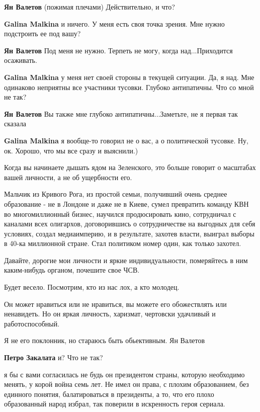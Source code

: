\begin{itemize}
\begin{itemize}
\textbf{Ян Валетов} (пожимая плечами) Действительно, и что?

\textbf{Galina Malkina} и ничего.
У меня есть своя точка зрения. Мне нужно подстроить ее под вашу?

\textbf{Ян Валетов} Под меня не нужно. Терпеть не могу, когда над...Приходится осаживать.

\textbf{Galina Malkina} у меня нет своей стороны в текущей ситуации.
Да, я над. Мне одинаково неприятны все участники тусовки. Глубоко антипатичны.
Что со мной не так?

\textbf{Ян Валетов} Вы также мне глубоко антипатичны...Заметьте, не я первая так сказала

\textbf{Galina Malkina} я вообще-то говорил не о вас, а о политической тусовке. Ну, ок. Хорошо, что мы все сразу и выяснили.)
\end{itemize} %


Когда вы начинаете дышать ядом на Зеленского, это больше говорит о масштабах
вашей личности, а не об ущербности его.

Мальчик из Кривого Рога, из простой семьи, получивший очень среднее образование
- не в Лондоне и даже не в Киеве, сумел превратить команду КВН во
многомиллионный бизнес, научился продюсировать кино, сотрудничал с каналами
всех олигархов, договорившись о сотрудничестве на выгодных для себя условиях,
создал медиаимперию, и в результате, захотев власти, выиграл выборы в 40-ка
миллионной стране. Стал политиком номер один, как только захотел.

Давайте, дорогие мои личности и яркие индивидуальности, померяйтесь в ним
каким-нибудь органом, почешите свое ЧСВ.

Будет весело. Посмотрим, кто из нас лох, а кто молодец.

Он может нравиться или не нравиться, вы можете его обожествлять или ненавидеть.
Но он яркая личность, харизмат, чертовски удачливый и работоспособный.

Я не его поклонник, но стараюсь быть обьективным. Ян Валетов

\begin{itemize} %
\textbf{Петро Закалата} и? Что не так?


я бы с вами согласилась не будь он президентом страны, которую необходимо
менять, у корой война семь лет. Не имел он права, с плохим образованием, без
единного понятия, балатироваться в президенты, а то, что его плохо образованный
народ избрал, так поверили в искренность героя сериала.


\end{itemize}
\end{itemize}
